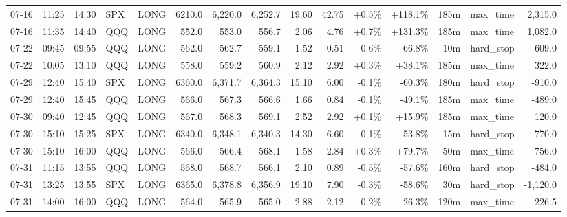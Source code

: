 \documentclass[11pt,a4paper,twoside]{article}
\begin{document}
\begin{landscape}
\begin{center}
\begin{longtable}{>{\color{txtmain}}l l l l l r r r r r r r r >{\color{txtmain}}l r}
07-16 & 11:25 & 14:30 & SPX & LONG & 6210.0 & 6,220.0 & 6,252.7 & 19.60 & 42.75 & \textcolor{wingreen}{+0.5\%} & \textcolor{wingreen}{+118.1\%} & 185m & max\_time & \textcolor{wingreen}{2,315.0} \\
07-16 & 11:35 & 14:40 & QQQ & LONG & 552.0 & 553.0 & 556.7 & 2.06 & 4.76 & \textcolor{wingreen}{+0.7\%} & \textcolor{wingreen}{+131.3\%} & 185m & max\_time & \textcolor{wingreen}{1,082.0} \\
07-22 & 09:45 & 09:55 & QQQ & LONG & 562.0 & 562.7 & 559.1 & 1.52 & 0.51 & \textcolor{lossred}{-0.6\%} & \textcolor{lossred}{-66.8\%} & 10m & hard\_stop & \textcolor{lossred}{-609.0} \\
07-22 & 10:05 & 13:10 & QQQ & LONG & 558.0 & 559.2 & 560.9 & 2.12 & 2.92 & \textcolor{wingreen}{+0.3\%} & \textcolor{wingreen}{+38.1\%} & 185m & max\_time & \textcolor{wingreen}{322.0} \\
07-29 & 12:40 & 15:40 & SPX & LONG & 6360.0 & 6,371.7 & 6,364.3 & 15.10 & 6.00 & \textcolor{lossred}{-0.1\%} & \textcolor{lossred}{-60.3\%} & 180m & hard\_stop & \textcolor{lossred}{-910.0} \\
07-29 & 12:40 & 15:45 & QQQ & LONG & 566.0 & 567.3 & 566.6 & 1.66 & 0.84 & \textcolor{lossred}{-0.1\%} & \textcolor{lossred}{-49.1\%} & 185m & max\_time & \textcolor{lossred}{-489.0} \\
07-30 & 09:40 & 12:45 & QQQ & LONG & 567.0 & 568.3 & 569.1 & 2.52 & 2.92 & \textcolor{wingreen}{+0.1\%} & \textcolor{wingreen}{+15.9\%} & 185m & max\_time & \textcolor{wingreen}{120.0} \\
07-30 & 15:10 & 15:25 & SPX & LONG & 6340.0 & 6,348.1 & 6,340.3 & 14.30 & 6.60 & \textcolor{lossred}{-0.1\%} & \textcolor{lossred}{-53.8\%} & 15m & hard\_stop & \textcolor{lossred}{-770.0} \\
07-30 & 15:10 & 16:00 & QQQ & LONG & 566.0 & 566.4 & 568.1 & 1.58 & 2.84 & \textcolor{wingreen}{+0.3\%} & \textcolor{wingreen}{+79.7\%} & 50m & max\_time & \textcolor{wingreen}{756.0} \\
07-31 & 11:15 & 13:55 & QQQ & LONG & 568.0 & 568.7 & 566.1 & 2.10 & 0.89 & \textcolor{lossred}{-0.5\%} & \textcolor{lossred}{-57.6\%} & 160m & hard\_stop & \textcolor{lossred}{-484.0} \\
07-31 & 13:25 & 13:55 & SPX & LONG & 6365.0 & 6,378.8 & 6,356.9 & 19.10 & 7.90 & \textcolor{lossred}{-0.3\%} & \textcolor{lossred}{-58.6\%} & 30m & hard\_stop & \textcolor{lossred}{-1,120.0} \\
07-31 & 14:00 & 16:00 & QQQ & LONG & 564.0 & 565.9 & 565.0 & 2.88 & 2.12 & \textcolor{lossred}{-0.2\%} & \textcolor{lossred}{-26.3\%} & 120m & max\_time & \textcolor{lossred}{-226.5} \\

\end{longtable}
\end{center}
\end{landscape}
\end{document}
